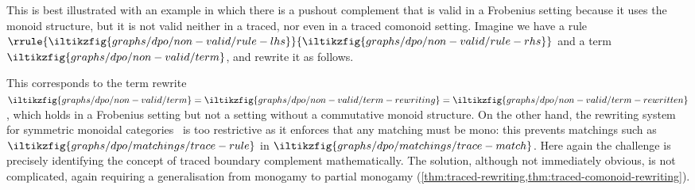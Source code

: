 This is best illustrated with an example in which there is a pushout
complement that is valid in a Frobenius setting because it uses the monoid
structure, but it is not valid neither in a traced, nor even in a traced
comonoid setting.
Imagine we have a rule \(\rrule{
    \iltikzfig{graphs/dpo/non-valid/rule-lhs}
}{
    \iltikzfig{graphs/dpo/non-valid/rule-rhs}
}\) and a term \(
    \iltikzfig{graphs/dpo/non-valid/term}
\), and rewrite it as follows.
\begin{center}
    
\end{center}
This corresponds to the term rewrite \(
    \iltikzfig{graphs/dpo/non-valid/term}
    =
    \iltikzfig{graphs/dpo/non-valid/term-rewriting}
    =
    \iltikzfig{graphs/dpo/non-valid/term-rewritten}
\), which holds in a Frobenius setting but not a setting without a commutative
monoid structure.
On the other hand, the rewriting system for symmetric monoidal
categories~\cite{bonchi2022stringa} is too restrictive as it enforces that any
matching must be mono: this prevents matchings such as \(
    \iltikzfig{graphs/dpo/matchings/trace-rule}
\) in \(
    \iltikzfig{graphs/dpo/matchings/trace-match}
\).
Here again the challenge is precisely identifying the concept of traced boundary
complement mathematically.
The solution, although not immediately obvious, is not complicated, again
requiring a generalisation from monogamy to partial monogamy
(\cref{thm:traced-rewriting,thm:traced-comonoid-rewriting}).

